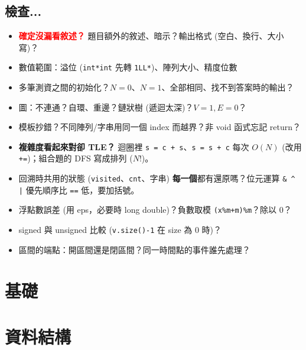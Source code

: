 \documentclass[portrait, 8pt, a4paper, oneside, twocolumn]{extarticle}
\begin{document}
\subsection{檢查...}
\begin{itemize}
    \item \textcolor{red}{\textbf{確定沒漏看敘述？}} 題目額外的敘述、暗示？輸出格式 (空白、換行、大小寫)？
    \item 數值範圍：溢位 (\texttt{int*int} 先轉 \texttt{1LL*})、陣列大小、精度位數
    \item 多筆測資之間的初始化？$N=0$、$N=1$、全部相同、找不到答案時的輸出？
    \item 圖：不連通？自環、重邊？鏈狀樹 (遞迴太深)？$V=1, E=0$？
    \item 模板抄錯？不同陣列/字串用同一個 index 而越界？非 void 函式忘記 return？
    \item \textbf{複雜度看起來對卻 TLE？} 迴圈裡 \texttt{s = c + s}、\texttt{s = s + c} 每次 $O(N)$ (改用 \texttt{+=})；組合題的 DFS 寫成排列 ($N!$)。
    \item 回溯時共用的狀態 (\texttt{visited}、\texttt{cnt}、字串) \textbf{每一個}都有還原嗎？位元運算 \texttt{\& \^{} |} 優先順序比 \texttt{==} 低，要加括號。
    \item 浮點數誤差 (用 eps，必要時 long double)？負數取模 \texttt{(x\%m+m)\%m}？除以 0？
    \item signed 與 unsigned 比較 (\texttt{v.size()-1} 在 size 為 0 時)？
    \item 區間的端點：開區間還是閉區間？同一時間點的事件誰先處理？
\end{itemize}

\section{基礎}





\section{資料結構}
\end{document}
